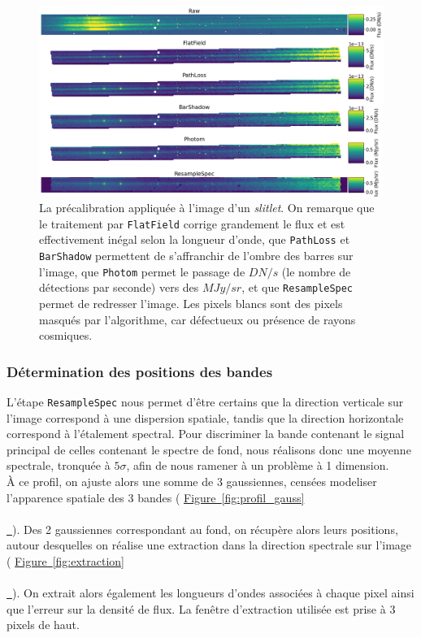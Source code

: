 \documentclass[12pt, a4paper]{article}
\newcommand*{\figref}[2][]{%
  \hyperref[{#2}]{%
    Figure~\ref*{#2}%
    \ifx\\#1\\%
    \else
      \,#1%
    \fi
  }%
}
\begin{document}
\begin{figure}[H]
  \centering
  \includegraphics[scale=0.45]{assets/precal.png}
  \caption{La précalibration appliquée à l'image d'un \textit{slitlet}. On remarque que le traitement par \texttt{FlatField} corrige grandement le flux et est effectivement inégal selon la longueur d'onde, que \texttt{PathLoss} et \texttt{BarShadow} permettent de s'affranchir de l'ombre des barres sur l'image, que \texttt{Photom} permet le passage de $DN/s$ (le nombre de détections par seconde) vers des $MJy/sr$, et que \texttt{ResampleSpec} permet de redresser l'image. Les pixels blancs sont des pixels masqués par l'algorithme, car défectueux ou présence de rayons cosmiques.}
  \label{fig:precal}
\end{figure}


\subsubsection{Détermination des positions des bandes}

L'étape \texttt{ResampleSpec} nous permet d'être certains que la direction verticale sur l'image correspond à une dispersion spatiale, tandis que la direction horizontale correspond à l'étalement spectral. Pour discriminer la bande contenant le signal principal de celles contenant le spectre de fond, nous réalisons donc une moyenne spectrale, tronquée à $5\sigma$, afin de nous ramener à un problème à 1 dimension.\\

À ce profil, on ajuste alors une somme de 3 gaussiennes, censées modeliser l'apparence spatiale des 3 bandes (\figref{fig:profil_gauss}). Des 2 gaussiennes correspondant au fond, on récupère alors leurs positions, autour desquelles on réalise une extraction dans la direction spectrale sur l'image (\figref{fig:extraction}). On extrait alors également les longueurs d'ondes associées à chaque pixel ainsi que l'erreur sur la densité de flux. La fenêtre d'extraction utilisée est prise à 3 pixels de haut.
\end{document}
